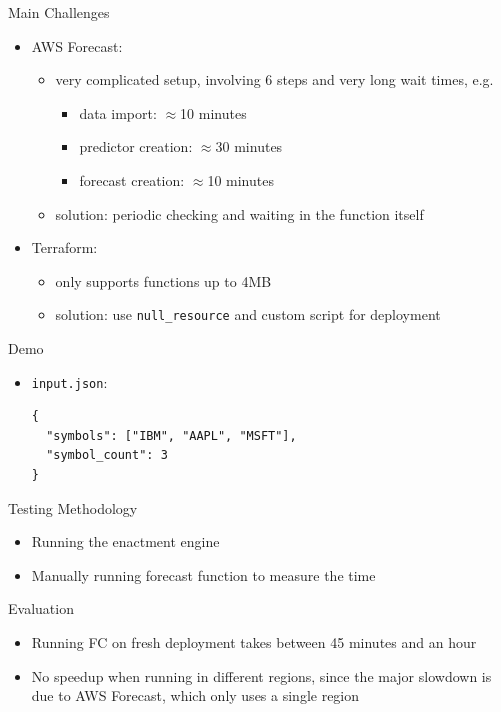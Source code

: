\documentclass[11pt,t,usepdftitle=false,aspectratio=169]{beamer}
\begin{document}
\begin{frame}{Main Challenges}
  \begin{itemize}
  \item AWS Forecast:
    \begin{itemize}
      \item very complicated setup, involving 6 steps and very long wait times, e.g.
        \begin{itemize}
          \item data import: $\approx$10 minutes
          \item predictor creation: $\approx$30 minutes
          \item forecast creation: $\approx$10 minutes
        \end{itemize}
      \item solution: periodic checking and waiting in the function itself
    \end{itemize}

  \item Terraform:
    \begin{itemize}
      \item only supports functions up to 4MB
      \item solution: use \texttt{null\_resource} and custom script for deployment
    \end{itemize}
  \end{itemize}
\end{frame}

\begin{frame}[fragile]{Demo}
    \begin{itemize}
      \item \texttt{input.json}:
        \begin{lstlisting}
{
  "symbols": ["IBM", "AAPL", "MSFT"],
  "symbol_count": 3
}
        \end{lstlisting}

    \end{itemize}
\end{frame}

\begin{frame}{Testing Methodology}
    \begin{itemize}
      \item Running the enactment engine
      \item Manually running forecast function to measure the time
    \end{itemize}
\end{frame}

\begin{frame}{Evaluation}
  \begin{itemize}
    \item Running FC on fresh deployment takes between 45 minutes and an hour
    \item No speedup when running in different regions, since the major slowdown
          is due to AWS Forecast, which only uses a single region
  \end{itemize}
\end{frame}
\end{document}
